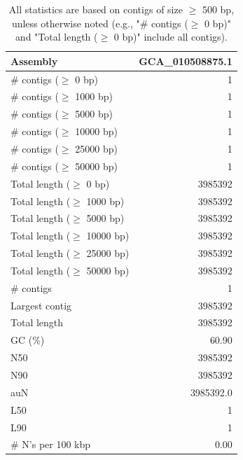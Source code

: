 \documentclass[12pt,a4paper]{article}
\begin{document}
\begin{table}[ht]
\begin{center}
\caption{All statistics are based on contigs of size $\geq$ 500 bp, unless otherwise noted (e.g., "\# contigs ($\geq$ 0 bp)" and "Total length ($\geq$ 0 bp)" include all contigs).}
\begin{tabular}{|l*{1}{|r}|}
\hline
Assembly & GCA\_010508875.1 \\ \hline
\# contigs ($\geq$ 0 bp) & 1 \\ \hline
\# contigs ($\geq$ 1000 bp) & 1 \\ \hline
\# contigs ($\geq$ 5000 bp) & 1 \\ \hline
\# contigs ($\geq$ 10000 bp) & 1 \\ \hline
\# contigs ($\geq$ 25000 bp) & 1 \\ \hline
\# contigs ($\geq$ 50000 bp) & 1 \\ \hline
Total length ($\geq$ 0 bp) & 3985392 \\ \hline
Total length ($\geq$ 1000 bp) & 3985392 \\ \hline
Total length ($\geq$ 5000 bp) & 3985392 \\ \hline
Total length ($\geq$ 10000 bp) & 3985392 \\ \hline
Total length ($\geq$ 25000 bp) & 3985392 \\ \hline
Total length ($\geq$ 50000 bp) & 3985392 \\ \hline
\# contigs & 1 \\ \hline
Largest contig & 3985392 \\ \hline
Total length & 3985392 \\ \hline
GC (\%) & 60.90 \\ \hline
N50 & 3985392 \\ \hline
N90 & 3985392 \\ \hline
auN & 3985392.0 \\ \hline
L50 & 1 \\ \hline
L90 & 1 \\ \hline
\# N's per 100 kbp & 0.00 \\ \hline
\end{tabular}
\end{center}
\end{table}
\end{document}
